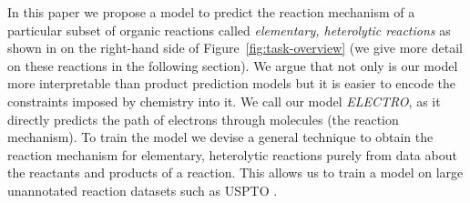 In this paper we propose a model to predict the reaction mechanism of a particular subset of organic reactions called \emph{elementary, heterolytic reactions} as shown in on the right-hand side of Figure~\ref{fig:task-overview} (we give more detail on these reactions in the following section). We argue that not only is our model more interpretable than product prediction models but it is easier to encode the constraints imposed by chemistry into it. We call our model \emph{ELECTRO}, as it directly predicts the path of electrons through molecules (the reaction mechanism). To train the model we devise a general technique to obtain the reaction mechanism for elementary, heterolytic reactions purely from data about the reactants and products of a reaction. This allows us to train a model on large unannotated reaction datasets such as USPTO \cite{lowe2012extraction}. %



